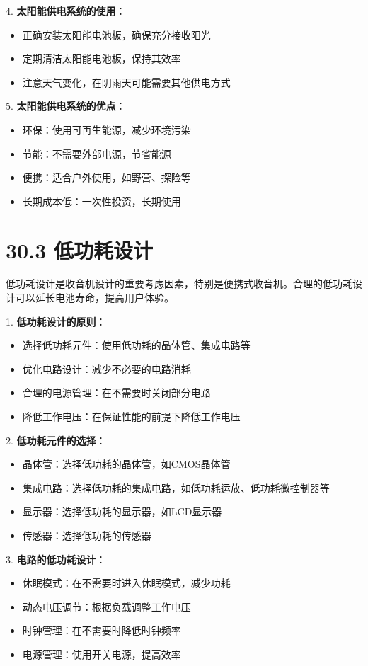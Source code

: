 \documentclass[12pt,UTF8]{ctexbook}
\begin{document}
4. \textbf{太阳能供电系统的使用}：
   \begin{itemize}[leftmargin=3.5em]
   \item 正确安装太阳能电池板，确保充分接收阳光
   \item 定期清洁太阳能电池板，保持其效率
   \item 注意天气变化，在阴雨天可能需要其他供电方式
   \end{itemize}

5. \textbf{太阳能供电系统的优点}：
   \begin{itemize}[leftmargin=3.5em]
   \item 环保：使用可再生能源，减少环境污染
   \item 节能：不需要外部电源，节省能源
   \item 便携：适合户外使用，如野营、探险等
   \item 长期成本低：一次性投资，长期使用
   \end{itemize}

\section*{30.3 低功耗设计}

低功耗设计是收音机设计的重要考虑因素，特别是便携式收音机。合理的低功耗设计可以延长电池寿命，提高用户体验。

1. \textbf{低功耗设计的原则}：
   \begin{itemize}[leftmargin=3.5em]
   \item 选择低功耗元件：使用低功耗的晶体管、集成电路等
   \item 优化电路设计：减少不必要的电路消耗
   \item 合理的电源管理：在不需要时关闭部分电路
   \item 降低工作电压：在保证性能的前提下降低工作电压
   \end{itemize}

2. \textbf{低功耗元件的选择}：
   \begin{itemize}[leftmargin=3.5em]
   \item 晶体管：选择低功耗的晶体管，如CMOS晶体管
   \item 集成电路：选择低功耗的集成电路，如低功耗运放、低功耗微控制器等
   \item 显示器：选择低功耗的显示器，如LCD显示器
   \item 传感器：选择低功耗的传感器
   \end{itemize}

3. \textbf{电路的低功耗设计}：
   \begin{itemize}[leftmargin=3.5em]
   \item 休眠模式：在不需要时进入休眠模式，减少功耗
   \item 动态电压调节：根据负载调整工作电压
   \item 时钟管理：在不需要时降低时钟频率
   \item 电源管理：使用开关电源，提高效率
   \end{itemize}
\end{document}
